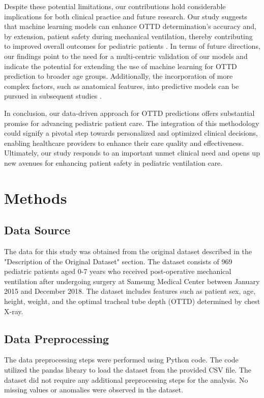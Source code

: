 \documentclass[11pt]{article}
\begin{document}
Despite these potential limitations, our contributions hold considerable implications for both clinical practice and future research. Our study suggests that machine learning models can enhance OTTD determination’s accuracy and, by extension, patient safety during mechanical ventilation, thereby contributing to improved overall outcomes for pediatric patients \cite{Tamburro2008ChangesIO}. In terms of future directions, our findings point to the need for a multi-centric validation of our models and indicate the potential for extending the use of machine learning for OTTD prediction to broader age groups. Additionally, the incorporation of more complex factors, such as anatomical features, into predictive models can be pursued in subsequent studies \cite{Szkely2006IntraoperativeAP}.

In conclusion, our data-driven approach for OTTD predictions offers substantial promise for advancing pediatric patient care. The integration of this methodology could signify a pivotal step towards personalized and optimized clinical decisions, enabling healthcare providers to enhance their care quality and effectiveness. Ultimately, our study responds to an important unmet clinical need and opens up new avenues for enhancing patient safety in pediatric ventilation care.

\section*{Methods}

\subsection*{Data Source}
The data for this study was obtained from the original dataset described in the "Description of the Original Dataset" section. The dataset consists of 969 pediatric patients aged 0-7 years who received post-operative mechanical ventilation after undergoing surgery at Samsung Medical Center between January 2015 and December 2018. The dataset includes features such as patient sex, age, height, weight, and the optimal tracheal tube depth (OTTD) determined by chest X-ray.

\subsection*{Data Preprocessing}
The data preprocessing steps were performed using Python code. The code utilized the pandas library to load the dataset from the provided CSV file. The dataset did not require any additional preprocessing steps for the analysis. No missing values or anomalies were observed in the dataset.
\end{document}
